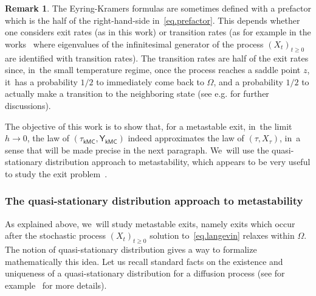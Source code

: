 \documentclass[10pt]{amsart}
\theoremstyle{plain}
\theoremstyle{definition}
\newtheorem{remark}[proposition]{Remark}
\begin{document}
\begin{remark} The Eyring-Kramers formulas are sometimes defined with
a prefactor which is the half of the right-hand-side in~\eqref{eq.prefactor}. This depends
whether one considers exit rates (as in this work) or transition
rates (as for example in the works~\cite{BEGK,BGK} where eigenvalues
of the infinitesimal generator of the process $(X_t)_{t \ge 0}$ are
identified with transition rates). The transition rates are half of
the exit rates since, in~the small temperature regime,
once the process reaches a saddle point $z$, it~has a probability
$1/2$ to immediately come back to $\Omega$, and a probability $1/2$ to actually
make a transition to the neighboring state (see e.g. \cite[Rem.\,8]{IHPLLN}
for further discussions).
\end{remark}

The objective of this work is to show that, for a metastable exit, in~the limit $h \to 0$,
the law of $(\tau_{\mathsf {kMC}}, \mathsf Y_{\mathsf
{kMC}})$ indeed approximates the law of $(\tau, X_\tau)$, in~a
sense that will be made precise in the next paragraph. We~will use the
quasi-stationary distribution approach to metastability, which appears
to be very useful to study the exit problem~\cite{le2012mathematical,DLLN,bianchi2020soft}.

\subsubsection*{The quasi-stationary distribution approach to metastability}
As explained above, we~will study metastable exits, namely exits which
occur after the stochastic process $(X_t)_{t \ge 0}$ solution
to~\eqref{eq.langevin} relaxes within $\Omega$. The notion of
quasi-stationary distribution gives a way to formalize mathematically
this idea. Let us recall standard facts on the existence and uniqueness of a
quasi-stationary distribution for a diffusion process (see for
example~\cite{cattiaux-collet-lambert-martinez-meleard-san-martin-09,collet-martinez-san-martin-13}
for more details).
\end{document}
